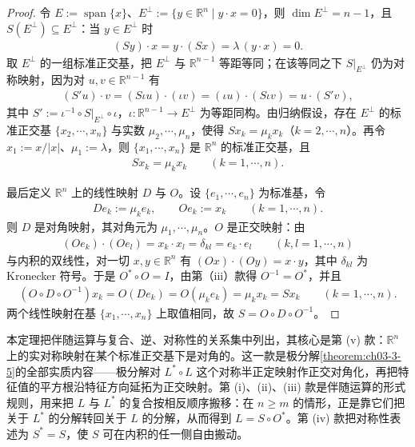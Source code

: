 \documentclass[../../main.tex]{subfiles}%
\begin{document}
\begin{proof}
令 $E:=\operatorname{span}\{x\}$、$E^{\perp}:=\{y\in\mathbb{R}^n\mid y\cdot x=0\}$，则 $\dim E^{\perp}=n-1$，且 $S(E^{\perp})\subseteq E^{\perp}$：当 $y\in E^{\perp}$ 时
\begin{align*}
(Sy)\cdot x=y\cdot(Sx)=\lambda\,(y\cdot x)=0.
\end{align*}
取 $E^{\perp}$ 的一组标准正交基，把 $E^{\perp}$ 与 $\mathbb{R}^{n-1}$ 等距等同；在该等同之下 $S|_{E^{\perp}}$ 仍为对称映射，因为对 $u,v\in\mathbb{R}^{n-1}$ 有
\begin{align*}
(S'u)\cdot v=(S\iota u)\cdot(\iota v)=(\iota u)\cdot(S\iota v)=u\cdot(S'v),
\end{align*}
其中 $S':=\iota^{-1}\circ S|_{E^{\perp}}\circ\iota$，$\iota:\mathbb{R}^{n-1}\to E^{\perp}$ 为等距同构。由归纳假设，存在 $E^{\perp}$ 的标准正交基 $\{x_2,\cdots,x_n\}$ 与实数 $\mu_2,\cdots,\mu_n$，使得 $Sx_k=\mu_kx_k$（$k=2,\cdots,n$）。再令 $x_1:=x/\lvert x\rvert$、$\mu_1:=\lambda$，则 $\{x_1,\cdots,x_n\}$ 是 $\mathbb{R}^n$ 的标准正交基，且
\begin{align*}
Sx_k=\mu_kx_k\qquad(k=1,\cdots,n).
\end{align*}

最后定义 $\mathbb{R}^n$ 上的线性映射 $D$ 与 $O$。设 $\{e_1,\cdots,e_n\}$ 为标准基，令
\begin{align*}
De_k:=\mu_ke_k,\qquad Oe_k:=x_k\qquad(k=1,\cdots,n).
\end{align*}
则 $D$ 是对角映射，其对角元为 $\mu_1,\cdots,\mu_n$。$O$ 是正交映射：由
\begin{align*}
(Oe_k)\cdot(Oe_l)=x_k\cdot x_l=\delta_{kl}=e_k\cdot e_l\qquad(k,l=1,\cdots,n)
\end{align*}
与内积的双线性，对一切 $x,y\in\mathbb{R}^n$ 有 $(Ox)\cdot(Oy)=x\cdot y$，其中 $\delta_{kl}$ 为 Kronecker 符号。于是 $O^*\circ O=I$，由第（iii）款得 $O^{-1}=O^*$，并且
\begin{align*}
(O\circ D\circ O^{-1})x_k=O(De_k)=O(\mu_ke_k)=\mu_kx_k=Sx_k\qquad(k=1,\cdots,n).
\end{align*}
两个线性映射在基 $\{x_1,\cdots,x_n\}$ 上取值相同，故 $S=O\circ D\circ O^{-1}$。
\end{proof}

\begin{remark}\label{remark:ch03-thm-3-4-动机}
本定理把伴随运算与复合、逆、对称性的关系集中列出，其核心是第 (v) 款：$\mathbb{R}^n$ 上的实对称映射在某个标准正交基下是对角的。这一款是极分解\cref{theorem:ch03-3-5}的全部实质内容——极分解对 $L^*\circ L$ 这个对称半正定映射作正交对角化，再把特征值的平方根沿特征方向延拓为正交映射。第 (i)、(ii)、(iii) 款是伴随运算的形式规则，用来把 $L$ 与 $L^*$ 的复合按相反顺序搬移：在 $n\geqslant m$ 的情形，正是靠它们把关于 $L^*$ 的分解转回关于 $L$ 的分解，从而得到 $L=S\circ O^*$。第 (iv) 款把对称性表述为 $S^*=S$，使 $S$ 可在内积的任一侧自由搬动。%
\end{remark}
\end{document}
